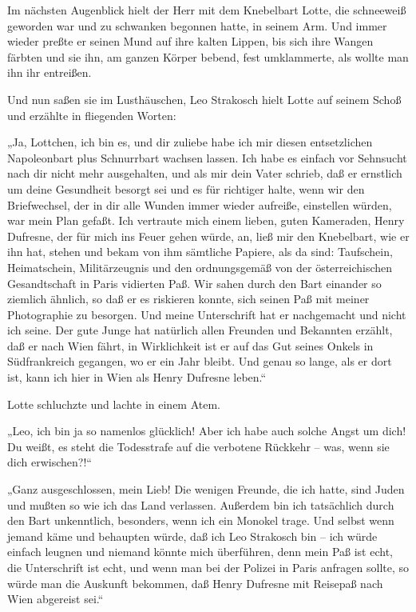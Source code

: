 Im nächsten Augenblick hielt der Herr mit dem Knebelbart Lotte, die
schneeweiß geworden war und zu schwanken begonnen hatte, in seinem
Arm. Und immer wieder preßte er seinen Mund auf ihre kalten Lippen,
bis sich ihre Wangen färbten und sie ihn, am ganzen Körper bebend,
fest umklammerte, als wollte man ihn ihr entreißen.

Und nun saßen sie im Lusthäuschen, Leo Strakosch hielt Lotte auf
seinem Schoß und erzählte in fliegenden Worten:

„Ja, Lottchen, ich bin es, und dir zuliebe habe ich mir diesen
entsetzlichen Napoleonbart plus Schnurrbart wachsen lassen. Ich
habe es einfach vor Sehnsucht nach dir nicht mehr ausgehalten, und
als mir dein Vater schrieb, daß er ernstlich um deine Gesundheit
besorgt sei und es für richtiger halte, wenn wir den Briefwechsel,
der in dir alle Wunden immer wieder aufreiße, einstellen würden,
war mein Plan gefaßt. Ich vertraute mich einem lieben, guten
Kameraden, Henry Dufresne, der für mich ins Feuer gehen würde, an,
ließ mir den Knebelbart, wie er ihn hat, stehen und bekam von ihm
sämtliche Papiere, als da sind: Taufschein, Heimatschein,
Militärzeugnis und den ordnungsgemäß von der österreichischen
Gesandtschaft in Paris  vidierten Paß. Wir sahen
durch den Bart einander so ziemlich ähnlich, so daß er es riskieren
konnte, sich seinen Paß mit meiner Photographie zu besorgen. Und
meine Unterschrift hat er nachgemacht und nicht ich seine. Der gute
Junge hat natürlich allen Freunden und Bekannten erzählt, daß er
nach Wien fährt, in Wirklichkeit ist er auf das Gut seines Onkels
in Südfrankreich gegangen, wo er ein Jahr bleibt. Und genau so
lange, als er dort ist, kann ich hier in Wien als Henry Dufresne
leben.“

Lotte schluchzte und lachte in einem Atem.

„Leo, ich bin ja so namenlos glücklich! Aber ich habe auch solche
Angst um dich! Du weißt, es steht die Todesstrafe auf die verbotene
Rückkehr – was, wenn sie dich erwischen?!“

„Ganz ausgeschlossen, mein Lieb! Die wenigen Freunde, die ich
hatte, sind Juden und mußten so wie ich das Land verlassen.
Außerdem bin ich tatsächlich durch den Bart unkenntlich, besonders,
wenn ich ein Monokel trage. Und selbst wenn jemand käme und
behaupten würde, daß ich Leo Strakosch bin – ich würde einfach
leugnen und niemand könnte mich überführen, denn mein Paß ist echt,
die Unterschrift ist echt, und wenn man bei der Polizei in Paris
anfragen sollte, so würde man die Auskunft bekommen, daß Henry
Dufresne mit Reisepaß nach Wien abgereist sei.“

